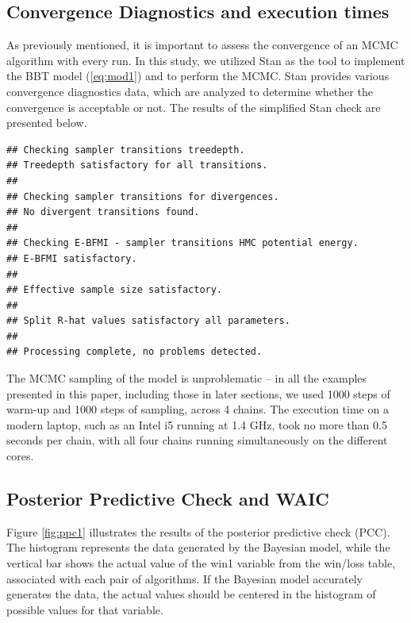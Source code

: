 \documentclass[twoside,11pt,preprint]{article}
\begin{document}
\hypertarget{convergence-diagnostics-and-execution-times}{%
\subsection{\texorpdfstring{Convergence Diagnostics and execution times \label{sec:conv1}}{Convergence Diagnostics and execution times }}\label{convergence-diagnostics-and-execution-times}}

As previously mentioned, it is important to assess the convergence of an MCMC algorithm with every run. In this study, we utilized Stan \citep{stan229} as the tool to implement the BBT model (\ref{eq:mod1}) and to perform the MCMC. Stan provides various convergence diagnostics data, which are analyzed to determine whether the convergence is acceptable or not. The results of the simplified Stan check are presented below.

\begin{verbatim}
## Checking sampler transitions treedepth.
## Treedepth satisfactory for all transitions.
## 
## Checking sampler transitions for divergences.
## No divergent transitions found.
## 
## Checking E-BFMI - sampler transitions HMC potential energy.
## E-BFMI satisfactory.
## 
## Effective sample size satisfactory.
## 
## Split R-hat values satisfactory all parameters.
## 
## Processing complete, no problems detected.
\end{verbatim}

The MCMC sampling of the model is unproblematic -- in all the examples presented in this paper, including those in later sections, we used 1000 steps of warm-up and 1000 steps of sampling, across 4 chains. The execution time on a modern laptop, such as an Intel i5 running at 1.4 GHz, took no more than 0.5 seconds per chain, with all four chains running simultaneously on the different cores.

\hypertarget{posterior-predictive-check-and-waic}{%
\subsection{\texorpdfstring{Posterior Predictive Check and WAIC \label{sec:ppc1}}{Posterior Predictive Check and WAIC }}\label{posterior-predictive-check-and-waic}}

Figure \ref{fig:ppc1} illustrates the results of the posterior predictive check (PCC). The histogram represents the data generated by the Bayesian model, while the vertical bar shows the actual value of the win1 variable from the win/loss table, associated with each pair of algorithms. If the Bayesian model accurately generates the data, the actual values should be centered in the histogram of possible values for that variable.
\end{document}

